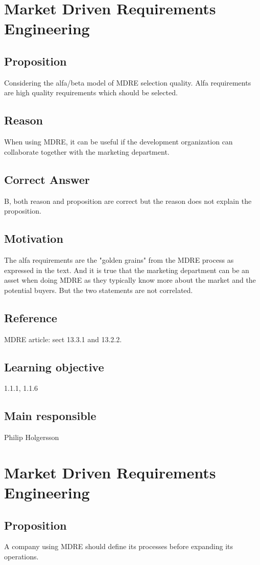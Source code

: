 \documentclass[a4paper]{article}
\begin{document}
\section{Market Driven Requirements Engineering}
\subsection*{Proposition}
Considering the alfa/beta model of MDRE selection quality. Alfa requirements are high quality requirements which should be selected.
\subsection*{Reason}
When using MDRE, it can be useful if the development organization can collaborate together with the marketing department.
\subsection*{Correct Answer}
B, both reason and proposition are correct but the reason does not explain the proposition.
\subsection*{Motivation}
The alfa requirements are the "golden grains" from the MDRE process as expressed in the text. And it is true that the marketing department can be an asset when doing MDRE as they typically know more about the market and the potential buyers. But the two statements are not correlated.
\subsection*{Reference}
MDRE article: sect 13.3.1 and 13.2.2.
\subsection*{Learning objective}
1.1.1, 1.1.6
\subsection*{Main responsible}
Philip Holgersson

\section{Market Driven Requirements Engineering}
\subsection*{Proposition}
A company using MDRE should define its processes before expanding its operations.
\end{document}
